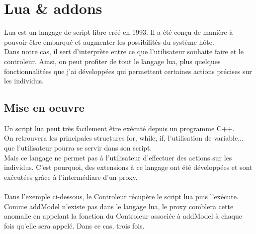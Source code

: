 \noindent\begin{minipage}{\linewidth}%
\end{minipage}

\section{Lua \& addons}
Lua est un langage de script libre créé en 1993. Il a été conçu de manière à pouvoir être embarqué et augmenter les possibilités du système hôte.\\
Dans notre cas, il sert d'interprète entre ce que l'utilisateur souhaite faire et le controleur. Ainsi, on peut profiter de tout le langage lua, plus quelques fonctionnalitées que j'ai développées qui permettent certaines actions précises sur les individus.\\
\subsection{Mise en oeuvre}
Un script lua peut très facilement être exécuté depuis un programme C++. \\
On retrouvera les principales structures for, while, if, l'utilisation de variable... que l'utilisateur pourra se servir dans son script.\\
Mais ce langage ne permet pas à l'utilisateur d'effectuer des actions sur les individus. C'est pourquoi, des extensions à ce langage ont été développées et sont exécutées grâce à l'intermédiare d'un proxy.\\
\\
Dans l'exemple ci-dessous, le Controleur récupère le script lua puis l'exécute. Comme addModel n'existe pas dans le langage lua, le proxy comblera cette anomalie en appelant la fonction du Controleur associée à addModel à chaque fois qu'elle sera appelé. Dans ce cas, trois fois.\\

